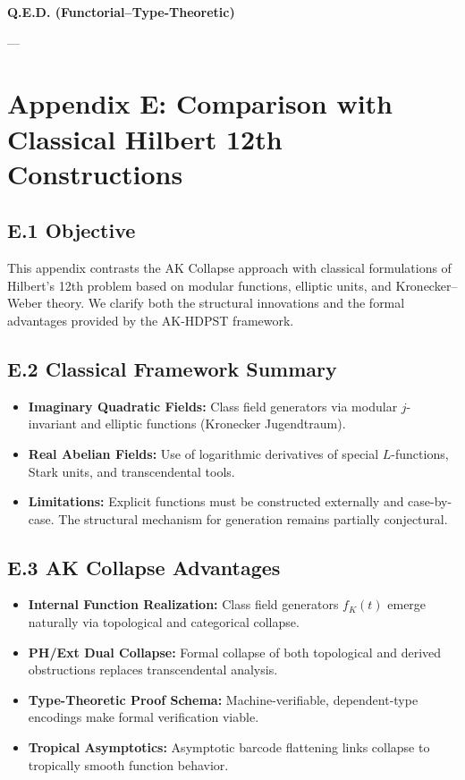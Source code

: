 \documentclass[11pt]{article}
\begin{document}
\begin{center}
\LARGE \textbf{Q.E.D. (Functorial–Type-Theoretic)}
\end{center}


---


\section*{Appendix E: Comparison with Classical Hilbert 12th Constructions}

\subsection*{E.1 Objective}

This appendix contrasts the AK Collapse approach with classical formulations of Hilbert’s 12th problem  
based on modular functions, elliptic units, and Kronecker–Weber theory.  
We clarify both the structural innovations and the formal advantages provided by the AK-HDPST framework.

\subsection*{E.2 Classical Framework Summary}

\begin{itemize}
    \item \textbf{Imaginary Quadratic Fields:} Class field generators via modular \( j \)-invariant and elliptic functions (Kronecker Jugendtraum).
    \item \textbf{Real Abelian Fields:} Use of logarithmic derivatives of special \( L \)-functions, Stark units, and transcendental tools.
    \item \textbf{Limitations:} Explicit functions must be constructed externally and case-by-case. The structural mechanism for generation remains partially conjectural.
\end{itemize}

\subsection*{E.3 AK Collapse Advantages}

\begin{itemize}
    \item \textbf{Internal Function Realization:} Class field generators \( f_K(t) \) emerge naturally via topological and categorical collapse.
    \item \textbf{PH/Ext Dual Collapse:} Formal collapse of both topological and derived obstructions replaces transcendental analysis.
    \item \textbf{Type-Theoretic Proof Schema:} Machine-verifiable, dependent-type encodings make formal verification viable.
    \item \textbf{Tropical Asymptotics:} Asymptotic barcode flattening links collapse to tropically smooth function behavior.
\end{itemize}
\end{document}
